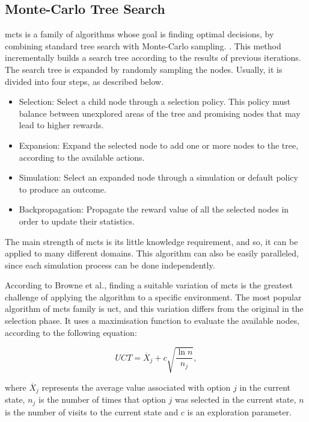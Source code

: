 \subsection{Monte-Carlo Tree Search}


\gls{mcts} is a family of algorithms whose goal is finding optimal decisions, by combining standard tree search with Monte-Carlo sampling. \cite{Browne2012}.
This method incrementally builds a search tree according to the results of previous iterations.
The search tree is expanded by randomly sampling the nodes.
Usually, it is divided into four steps, as described below.
\begin{itemize}
  \item Selection: Select a child node through a selection policy. This policy must balance between unexplored areas of the tree and promising nodes that may lead to higher rewards.
  \item Expansion: Expand the selected node to add one or more nodes to the tree, according to the available actions.
  \item Simulation: Select an expanded node through a simulation or default policy to produce an outcome.
  \item Backpropagation: Propagate the reward value of all the selected nodes in order to update their statistics.
\end{itemize}


The main strength of \gls{mcts} is its little knowledge requirement, and so, it can be applied to many different domains.
This algorithm can also be easily paralleled, since each simulation process can be done independently.


According to Browne et al., finding a suitable variation of \gls{mcts} is the greatest challenge of applying the algorithm to a specific environment.
The most popular algorithm of \gls{mcts} family is \gls{uct}, and this variation differs from the original in the selection phase.
It uses a maximisation function to evaluate the available nodes, according to the following equation:

\begin{equation}
    UCT = \overline{X}_j + c\sqrt{\frac{\ln n}{n_j}},
\end{equation}

where $\overline{X}_j$ represents the average value associated with option $j$ in the current state, $n_j$ is the number of times that option $j$ was selected in the current state, $n$ is the number of visits to the current state and $c$ is an exploration parameter.

